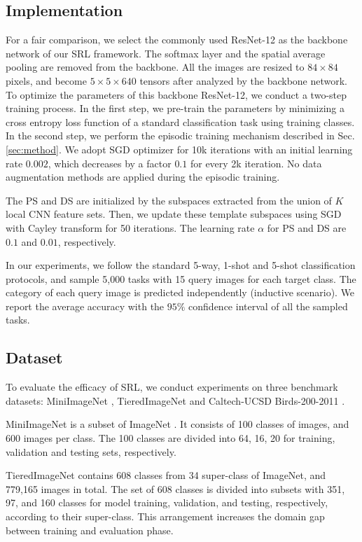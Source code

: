 \subsection{Implementation}
For a fair comparison, we select the commonly used ResNet-12 as the backbone network of our SRL framework.
The softmax layer and the spatial average pooling are removed from the backbone.
All the images are resized to $84 \times 84$ pixels, and become $5 \times 5 \times 640$ tensors after analyzed by the backbone network.
To optimize the parameters of this backbone ResNet-12, we conduct a two-step training process.
In the first step, we pre-train the parameters by minimizing a cross entropy loss function of a standard classification task using training classes.
In the second step, we perform the episodic training mechanism described in Sec. \ref{sec:method}.
We adopt SGD optimizer for 10k iterations with an initial learning rate $0.002$, which decreases by a factor $0.1$ for every 2k iteration.
No data augmentation methods are applied during the episodic training.

The PS and DS are initialized by the subspaces extracted from the union of $K$ local CNN feature sets.
Then, we update these template subspaces using SGD with Cayley transform for 50 iterations.
The learning rate $\alpha$ for PS and DS are $0.1$ and $0.01$, respectively.

In our experiments, we follow the standard 5-way, 1-shot and 5-shot classification protocols, and sample 5,000 tasks with 15 query images for each target class.
The category of each query image is predicted independently (inductive scenario).
We report the average accuracy with the $95\%$ confidence interval of all the sampled tasks.


\subsection{Dataset}
To evaluate the efficacy of SRL, we conduct experiments on three benchmark datasets:
MiniImageNet \cite{Sachin2017}, TieredImageNet \cite{ren18fewshotssl} and Caltech-UCSD Birds-200-2011 \cite{cub}.

MiniImageNet is a subset of ImageNet \cite{russakovsky2015imagenet}. 
It consists of 100 classes of images, and 600 images per class.
The 100 classes are divided into 64, 16, 20 for training, validation and testing sets, respectively.

TieredImageNet contains 608 classes from 34 super-class of ImageNet, and 779,165 images in total.
The set of 608 classes is divided into subsets with 351, 97, and 160 classes for model training, validation, and testing, respectively, according to their super-class.
This arrangement increases the domain gap between training and evaluation phase.

